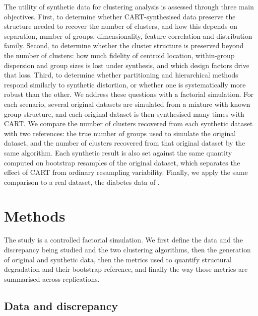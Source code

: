 \documentclass[pdflatex,referee]{sn-jnl}
\begin{document}
The utility of synthetic data for clustering analysis is assessed through three
main objectives. First, to determine whether CART-synthesised data preserve the
structure needed to recover the number of clusters, and how this depends on
separation, number of groups, dimensionality, feature correlation and
distribution family. Second, to determine whether the cluster structure is
preserved beyond the number of clusters: how much fidelity of centroid
location, within-group dispersion and group sizes is lost under synthesis, and
which design factors drive that loss. Third, to determine whether partitioning
and hierarchical methods respond similarly to synthetic distortion, or whether
one is systematically more robust than the other. We address these questions
with a factorial simulation. For each scenario, several original datasets are
simulated from a mixture with known group structure, and each original dataset
is then synthesised many times with CART. We compare the number of clusters
recovered from each synthetic dataset with two references: the true number of
groups used to simulate the original dataset, and the number of clusters
recovered from that original dataset by the same algorithm. Each synthetic
result is also set against the same quantity computed on bootstrap resamples
of the original dataset, which separates the effect of CART from ordinary
resampling variability. Finally, we apply the same comparison to a real
dataset, the diabetes data of \citet{reaven1979}.

\section{Methods}

The study is a controlled factorial simulation. We first define the data and
the discrepancy being studied and the two clustering algorithms, then the
generation of original and synthetic data, then the metrics used to quantify
structural degradation and their bootstrap reference, and finally the way
those metrics are summarised across replications.

\subsection{Data and discrepancy}
\end{document}
